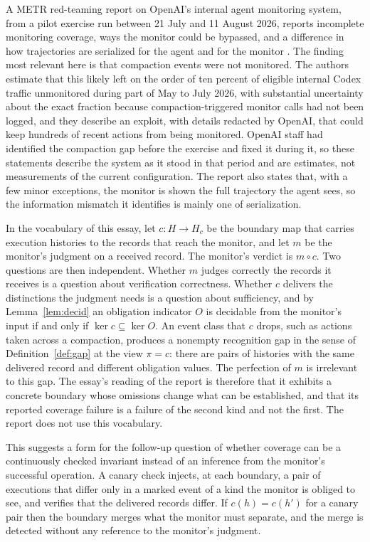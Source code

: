 \documentclass[11pt]{article}
\theoremstyle{definition}
\theoremstyle{remark}
\newcommand{\Hist}{H}
\begin{document}
A METR red-teaming report on OpenAI's internal agent monitoring system, from a pilot exercise run between 21 July and 11 August 2026, reports incomplete monitoring coverage, ways the monitor could be bypassed, and a difference in how trajectories are serialized for the agent and for the monitor \cite{redteam}. The finding most relevant here is that compaction events were not monitored. The authors estimate that this likely left on the order of ten percent of eligible internal Codex traffic unmonitored during part of May to July 2026, with substantial uncertainty about the exact fraction because compaction-triggered monitor calls had not been logged, and they describe an exploit, with details redacted by OpenAI, that could keep hundreds of recent actions from being monitored. OpenAI staff had identified the compaction gap before the exercise and fixed it during it, so these statements describe the system as it stood in that period and are estimates, not measurements of the current configuration. The report also states that, with a few minor exceptions, the monitor is shown the full trajectory the agent sees, so the information mismatch it identifies is mainly one of serialization.

In the vocabulary of this essay, let $c:\Hist\to\Hist_c$ be the boundary map that carries execution histories to the records that reach the monitor, and let $m$ be the monitor's judgment on a received record. The monitor's verdict is $m\circ c$. Two questions are then independent. Whether $m$ judges correctly the records it receives is a question about verification correctness. Whether $c$ delivers the distinctions the judgment needs is a question about sufficiency, and by Lemma~\ref{lem:decid} an obligation indicator $O$ is decidable from the monitor's input if and only if $\ker c\subseteq\ker O$. An event class that $c$ drops, such as actions taken across a compaction, produces a nonempty recognition gap in the sense of Definition~\ref{def:gap} at the view $\pi=c$: there are pairs of histories with the same delivered record and different obligation values. The perfection of $m$ is irrelevant to this gap. The essay's reading of the report is therefore that it exhibits a concrete boundary whose omissions change what can be established, and that its reported coverage failure is a failure of the second kind and not the first. The report does not use this vocabulary.

This suggests a form for the follow-up question of whether coverage can be a continuously checked invariant instead of an inference from the monitor's successful operation. A canary check injects, at each boundary, a pair of executions that differ only in a marked event of a kind the monitor is obliged to see, and verifies that the delivered records differ. If $c(h)=c(h')$ for a canary pair then the boundary merges what the monitor must separate, and the merge is detected without any reference to the monitor's judgment.
\end{document}
